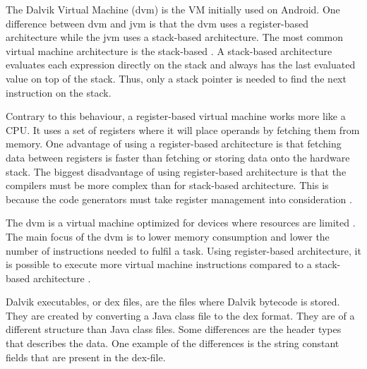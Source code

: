 
The Dalvik Virtual Machine (\gls{dvm}) is the VM initially used on Android. One difference between \gls{dvm} and \gls{jvm} is that the \gls{dvm} uses a register-based architecture while the \gls{jvm} uses a stack-based architecture. The most common virtual machine architecture is the stack-based \cite[p.~158]{craig2010virtual}. A stack-based architecture evaluates each expression directly on the stack and always has the last evaluated value on top of the stack. Thus, only a stack pointer is needed to find the next instruction on the stack.

Contrary to this behaviour, a register-based virtual machine works more like a CPU. It uses a set of registers where it will place operands by fetching them from memory. One advantage of using a register-based architecture is that fetching data between registers is faster than fetching or storing data onto the hardware stack. The biggest disadvantage of using register-based architecture is that the compilers must be more complex than for stack-based architecture. This is because the code generators must take register management into consideration \cite[p.~159-160]{craig2010virtual}.

The \gls{dvm} is a virtual machine optimized for devices where resources are limited \cite{android:dalvik:internals}. The main focus of the \gls{dvm} is to lower memory consumption and lower the number of instructions needed to fulfil a task. Using register-based architecture, it is possible to execute more virtual machine instructions compared to a stack-based architecture \cite{shi2008virtual}. 




Dalvik executables, or \gls{dex} files, are the files where Dalvik bytecode is stored. They are created by converting a Java class file to the \gls{dex} format. They are of a different structure than Java class files. Some differences are the header types that describes the data. One example of the differences is the string constant fields that are present in the \gls{dex}-file. %

